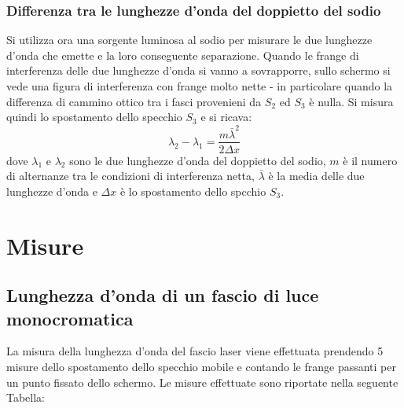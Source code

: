 \documentclass[]{article}
\let\oldsection\section%
\renewcommand{\section}{%
	\renewcommand{\theequation}{\thesection.\arabic{equation}}%
	\oldsection}%
\let\oldsubsection\subsection%
\renewcommand{\subsection}{%
	\renewcommand{\theequation}{\thesubsection.\arabic{equation}}%
	\oldsubsection}%
\begin{document}
\subsubsection{Differenza tra le lunghezze d'onda del doppietto del sodio}

Si utilizza ora una sorgente luminosa al sodio per misurare le due lunghezze d'onda che emette e la loro conseguente separazione. Quando le frange di interferenza delle due lunghezze d'onda si vanno a sovrapporre, sullo schermo si vede una figura di interferenza con frange molto nette - in particolare quando la differenza di cammino ottico tra i fasci provenieni da $S_2$ ed $S_3$ è nulla. 
Si misura quindi lo spostamento dello specchio $S_3$ e si ricava:
\begin{equation}
    \label{Delta_lambda}
    \lambda _2 - \lambda _1 = \frac {m \bar{\lambda} ^2 }{2 \Delta x}
\end{equation}
dove $\lambda _1$ e $\lambda _2$ sono le due lunghezze d'onda del doppietto del sodio, $m$ è il numero di alternanze tra le condizioni di interferenza netta, $\bar{\lambda}$ è la media delle due lunghezze d'onda e $\Delta x$ è lo spostamento dello spcchio $S_3$.

\section{Misure}

\subsection {Lunghezza d'onda di un fascio di luce monocromatica}

La misura della lunghezza d'onda del fascio laser viene effettuata prendendo 5 misure dello spostamento dello specchio mobile e contando le frange passanti per un punto fissato dello schermo. Le misure effettuate sono riportate nella seguente Tabella:
\end{document}
